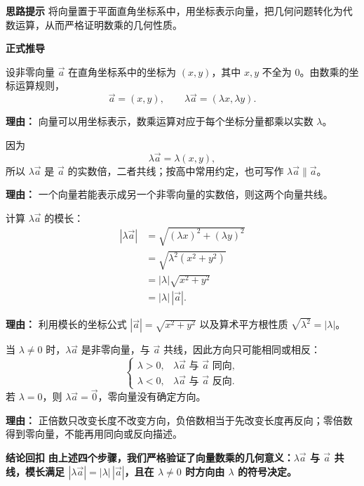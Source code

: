 \begin{proofbox}
	\textbf{\textcolor{CProof}{思路提示}}
	将向量置于平面直角坐标系中，用坐标表示向量，把几何问题转化为代数运算，从而严格证明数乘的几何性质。

	\medskip
	\textbf{\textcolor{CProof}{正式推导}}
	\begin{description}[style=nextline, leftmargin=2.8em, labelsep=0.5em, itemsep=0.55em]
		\item[\textbf{步骤一（坐标设定）：}]
		      设非零向量 $\vec{a}$ 在直角坐标系中的坐标为 $(x,y)$，其中 $x,y$ 不全为 $0$。由数乘的坐标运算规则，
		      \[
			      \vec{a}=(x,y),\qquad \lambda\vec{a}=(\lambda x,\lambda y).
		      \]
		      \par\textbf{理由：} 向量可以用坐标表示，数乘运算对应于每个坐标分量都乘以实数 $\lambda$。
		\item[\textbf{步骤二（共线性证明）：}]
		      因为
		      \[
			      \lambda\vec{a}=\lambda(x,y),
		      \]
		      所以 $\lambda\vec{a}$ 是 $\vec{a}$ 的实数倍，二者共线；按高中常用约定，也可写作 $\lambda\vec{a}\parallel\vec{a}$。
		      \par\textbf{理由：} 一个向量若能表示成另一个非零向量的实数倍，则这两个向量共线。
		\item[\textbf{步骤三（模长公式推导）：}]
		      计算 $\lambda\vec{a}$ 的模长：
		      \[
			      \begin{aligned}
				      |\lambda\vec{a}|
				       & = \sqrt{(\lambda x)^2+(\lambda y)^2} \\
				       & = \sqrt{\lambda^2(x^2+y^2)}          \\
				       & = |\lambda|\sqrt{x^2+y^2}            \\
				       & = |\lambda|\,|\vec{a}|.
			      \end{aligned}
		      \]
		      \par\textbf{理由：} 利用模长的坐标公式 $|\vec{a}|=\sqrt{x^2+y^2}$ 以及算术平方根性质 $\sqrt{\lambda^2}=|\lambda|$。
		\item[\textbf{步骤四（方向规律证明）：}]
		      当 $\lambda\neq0$ 时，$\lambda\vec{a}$ 是非零向量，与 $\vec{a}$ 共线，因此方向只可能相同或相反：
		      \[
			      \begin{cases}
				      \lambda>0, & \lambda\vec{a}\text{ 与 }\vec{a}\text{ 同向}, \\[2pt]
				      \lambda<0, & \lambda\vec{a}\text{ 与 }\vec{a}\text{ 反向}.
			      \end{cases}
		      \]
		      若 $\lambda=0$，则 $\lambda\vec{a}=\vec{0}$，零向量没有确定方向。
		      \par\textbf{理由：} 正倍数只改变长度不改变方向，负倍数相当于先改变长度再反向；零倍数得到零向量，不能再用同向或反向描述。
	\end{description}

	\medskip
	\textbf{\textcolor{CProof}{结论回扣}}
	\textbf{由上述四个步骤，我们严格验证了向量数乘的几何意义：$\lambda\vec{a}$ 与 $\vec{a}$ 共线，模长满足 $|\lambda\vec{a}|=|\lambda|\,|\vec{a}|$，且在 $\lambda\neq0$ 时方向由 $\lambda$ 的符号决定。}
\end{proofbox}